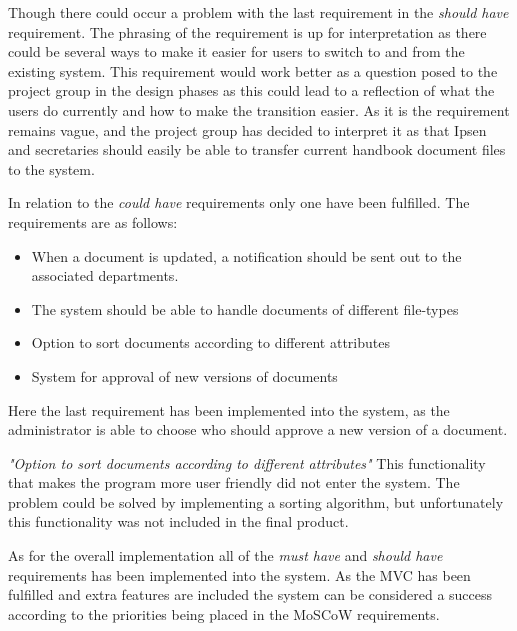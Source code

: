 Though there could occur a problem with the last requirement in the \textit{should have} requirement.
The phrasing of the requirement is up for interpretation as there could be several ways to make it easier for users to switch to and from the existing system.
This requirement would work better as a question posed to the project group in the design phases as this could lead to a reflection of what the users do currently and how to make the transition easier.
As it is the requirement remains vague, and the project group has decided to interpret it as that Ipsen and secretaries should easily be able to transfer current handbook document files to the system.

In relation to the \textit{could have} requirements only one have been fulfilled.
The requirements are as follows:

 \begin{itemize}
 	\item 
    When a document is updated, a notification should be sent out to the associated departments.
	\item 
    The system should be able to handle documents of different file-types
    \item 
    Option to sort documents according to different attributes
    \item 
    System for approval of new versions of documents
\end{itemize}

Here the last requirement has been implemented into the system, as the administrator is able to choose who should approve a new version of a document.

\textit{"Option to sort documents according to different attributes"}
This functionality that makes the program more user friendly did not enter the system.
The problem could be solved by implementing a sorting algorithm, but unfortunately this functionality was not included in the final product.

As for the overall implementation all of the \textit{must have} and \textit{should have} requirements has been implemented into the system.
As the MVC has been fulfilled and extra features are included the system can be considered a success according to the priorities being placed in the MoSCoW requirements.


